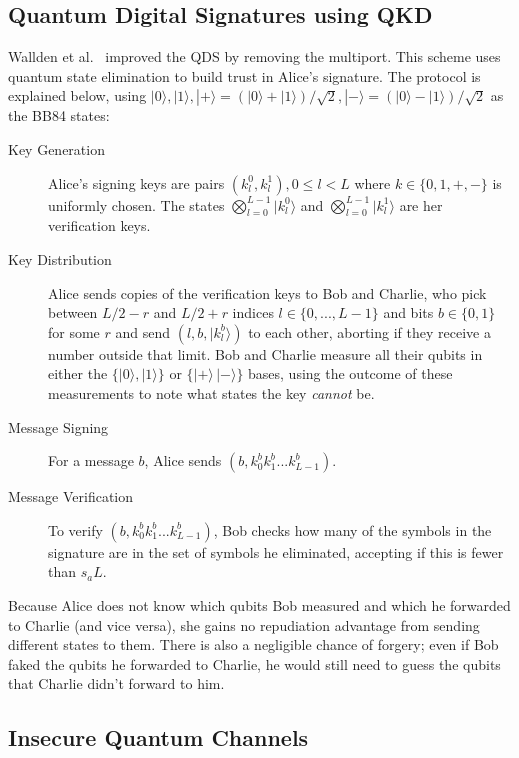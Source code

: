 \documentclass[%
 reprint,
 amsmath,amssymb,
 aps,
 pra,
]{revtex4-1}
\begin{document}
\subsection{Quantum Digital Signatures using QKD}
\label{ssec:qds-using-qkd}

Wallden et al.\ \cite{PhysRevA.91.042304} improved the QDS by removing the multiport. This scheme uses quantum state elimination \cite{PhysRevA.89.022336} to build trust in Alice's signature. The protocol is explained below, using $|0\rangle, |1\rangle, |+\rangle = (|0\rangle + |1\rangle)/\sqrt{2}, |-\rangle = (|0\rangle - |1\rangle)/\sqrt{2}$ as the BB84 \cite{BB84} states:

\begin{description}
\item[Key Generation]Alice's signing keys are pairs $(k^0_l, k^1_l), 0 \leq l < L$ where $k \in \{0, 1, +, -\}$ is uniformly chosen. The states $\bigotimes_{l=0}^{L-1}|k^0_l\rangle$ and $\bigotimes_{l=0}^{L-1}|k^1_l\rangle$ are her verification keys.
\item[Key Distribution]Alice sends copies of the verification keys to Bob and Charlie, who pick between $L/2-r$ and $L/2+r$ indices $l \in \{0,...,L-1\}$ and bits $b \in \{0, 1\}$ for some $r$ and send $(l, b, |k^b_l\rangle)$ to each other, aborting if they receive a number outside that limit. Bob and Charlie measure all their qubits in either the $\{|0\rangle, |1\rangle\}$ or $\{|+\rangle\, |-\rangle\}$ bases, using the outcome of these measurements to note what states the key \textit{cannot} be.
\item[Message Signing]For a message $b$, Alice sends $(b, k^b_0k^b_1...k^b_{L-1})$.
\item[Message Verification]To verify $(b, k^b_0k^b_1...k^b_{L-1})$, Bob checks how many of the symbols in the signature are in the set of symbols he eliminated, accepting if this is fewer than $s_aL$.
\end{description}

Because Alice does not know which qubits Bob measured and which he forwarded to Charlie (and vice versa), she gains no repudiation advantage from sending different states to them. There is also a negligible chance of forgery; even if Bob faked the qubits he forwarded to Charlie, he would still need to guess the qubits that Charlie didn't forward to him.

\subsection{Insecure Quantum Channels}
\label{ssec:insecure-qc}
\end{document}
